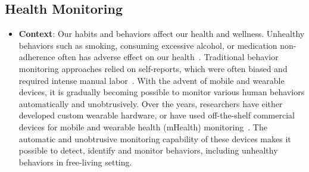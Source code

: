 \subsection{Health Monitoring}
    \begin{itemize}
        \item \textbf{Context}: Our habits and behaviors affect our health and wellness. Unhealthy  behaviors such as smoking, consuming excessive alcohol, or medication non-adherence often has adverse effect on our health~\cite{baker2000health,klesges1989smoking,sokol2005impact,white2013burden}. Traditional behavior monitoring approaches relied on self-reports, which were often biased and required intense manual labor~\cite{althubaiti2016information}. With the advent of mobile and wearable devices, it is gradually becoming possible to monitor various human behaviors automatically and unobtrusively. Over the years, researchers have either developed custom wearable hardware, or have used off-the-shelf commercial devices for mobile and wearable health (mHealth) monitoring~\cite{dong2012new,parate2014risq,ali2012mpuff,sen2020annapurna,bi2018auracle,zhang2020necksense,mishra2020continuous}. The automatic and unobtrusive monitoring capability of these devices makes it possible to detect, identify and monitor behaviors, including unhealthy behaviors in free-living setting.   
        

\end{itemize}
